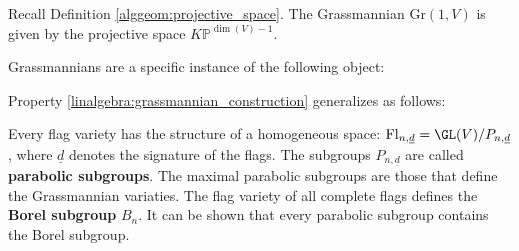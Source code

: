     \begin{example}
        Recall Definition \ref{alggeom:projective_space}. The Grassmannian $\mathrm{Gr}(1,V)$ is given by the projective space $K\mathbb{P}^{\dim(V)-1}$.
    \end{example}


    Grassmannians are a specific instance of the following object:

    Property \ref{linalgebra:grassmannian_construction} generalizes as follows:
    \begin{property}
        Every flag variety has the structure of a homogeneous space: $\mathrm{Fl}_{n,\underline{d}}=\GL(V)/P_{n,\underline{d}}$, where $\underline{d}$ denotes the signature of the flags. The subgroups $P_{n,\underline{d}}$ are called \textbf{parabolic subgroups}. The maximal parabolic subgroups are those that define the Grassmannian variaties. The flag variety of all complete flags defines the \textbf{Borel subgroup} $B_n$. It can be shown that every parabolic subgroup contains the Borel subgroup.
    \end{property}